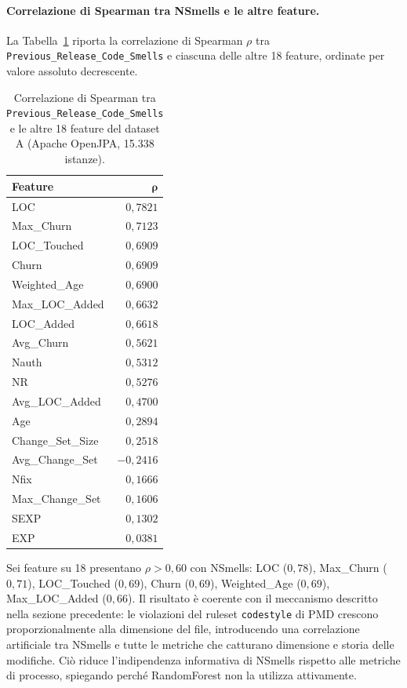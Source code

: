 \paragraph{Correlazione di Spearman tra NSmells e le altre feature.}

La Tabella~\ref{tab:whatif_correlation} riporta la correlazione di Spearman $\rho$ tra
\texttt{Previous\_Release\_Code\_Smells} e ciascuna delle altre 18 feature, ordinate per
valore assoluto decrescente.

\begin{table}[h]
\centering
\begin{tabular}{lr}
\toprule
\textbf{Feature} & $\boldsymbol{\rho}$ \\
\midrule
LOC               & $0{,}7821$ \\
Max\_Churn        & $0{,}7123$ \\
LOC\_Touched      & $0{,}6909$ \\
Churn             & $0{,}6909$ \\
Weighted\_Age     & $0{,}6900$ \\
Max\_LOC\_Added   & $0{,}6632$ \\
LOC\_Added        & $0{,}6618$ \\
Avg\_Churn        & $0{,}5621$ \\
Nauth             & $0{,}5312$ \\
NR                & $0{,}5276$ \\
Avg\_LOC\_Added   & $0{,}4700$ \\
Age               & $0{,}2894$ \\
Change\_Set\_Size & $0{,}2518$ \\
Avg\_Change\_Set  & $-0{,}2416$ \\
Nfix              & $0{,}1666$ \\
Max\_Change\_Set  & $0{,}1606$ \\
SEXP              & $0{,}1302$ \\
EXP               & $0{,}0381$ \\
\bottomrule
\end{tabular}
\caption{Correlazione di Spearman tra \texttt{Previous\_Release\_Code\_Smells} e le altre
         18 feature del dataset A (Apache OpenJPA, 15.338 istanze).}
\label{tab:whatif_correlation}
\end{table}

Sei feature su 18 presentano $\rho > 0{,}60$ con NSmells: LOC ($0{,}78$), Max\_Churn
($0{,}71$), LOC\_Touched ($0{,}69$), Churn ($0{,}69$), Weighted\_Age ($0{,}69$),
Max\_LOC\_Added ($0{,}66$). Il risultato è coerente con il meccanismo descritto nella
sezione precedente: le violazioni del ruleset \texttt{codestyle} di PMD crescono
proporzionalmente alla dimensione del file, introducendo una correlazione artificiale tra
NSmells e tutte le metriche che catturano dimensione e storia delle modifiche. Ciò riduce
l'indipendenza informativa di NSmells rispetto alle metriche di processo, spiegando
perché RandomForest non la utilizza attivamente.

